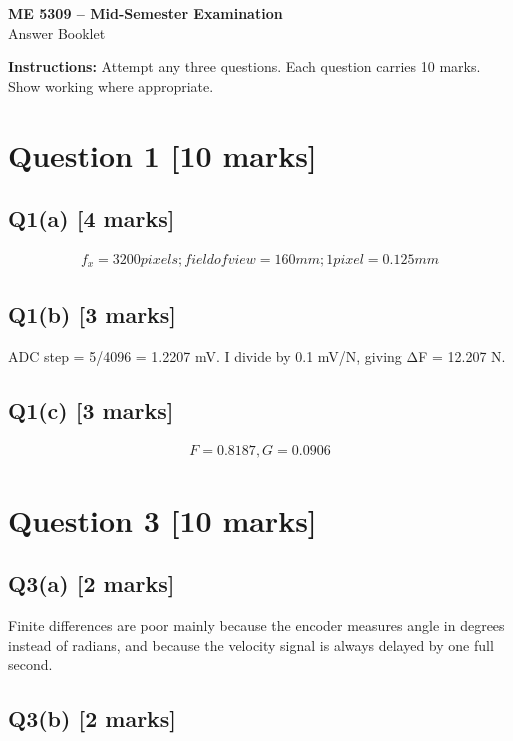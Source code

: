 \documentclass[11pt,a4paper]{article}
\begin{document}
\begin{center}
{\Large\bfseries ME 5309 -- Mid-Semester Examination}\\[3pt]
{\large Answer Booklet}\\[8pt]
\end{center}
\textbf{Instructions:} Attempt any three questions. Each question carries 10 marks. Show working where appropriate.
\section*{Question 1 \hfill [10 marks]}
\subsection*{Q1(a) \hfill [4 marks]}

\[\begin{aligned}f_x = 3200 pixels; field of view = 160 mm; 1 pixel = 0.125 mm\end{aligned}\]

\subsection*{Q1(b) \hfill [3 marks]}

ADC step = 5/4096 = 1.2207 mV.
I divide by 0.1 mV/N, giving ΔF = 12.207 N.

\subsection*{Q1(c) \hfill [3 marks]}

\[\begin{aligned}F = 0.8187, G = 0.0906\end{aligned}\]

\section*{Question 3 \hfill [10 marks]}
\subsection*{Q3(a) \hfill [2 marks]}

Finite differences are poor mainly because the encoder measures angle in degrees instead of radians, and because the velocity signal is always delayed by one full second.

\subsection*{Q3(b) \hfill [2 marks]}
\end{document}
